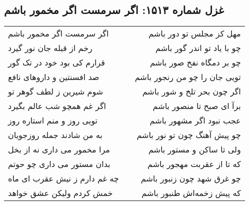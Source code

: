 \begin{center}
\section*{غزل شماره ۱۵۱۳: اگر سرمست اگر مخمور باشم}
\label{sec:1513}
\begin{longtable}{l p{0.5cm} r}
اگر سرمست اگر مخمور باشم
&&
مهل کز مجلس تو دور باشم
\\
رخم از قبله جان نور گیرد
&&
چو با یاد تو اندر گور باشم
\\
قرارم کی بود خود در تک گور
&&
چو بر دمگاه نفخ صور باشم
\\
صد افسنتین و داروهای نافع
&&
تویی جان را چو من رنجور باشم
\\
شوم شیرین ز لطف گوهر تو
&&
اگر چون بحر تلخ و شور باشم
\\
اگر غم همچو شب عالم بگیرد
&&
برآ ای صبح تا منصور باشم
\\
تویی روز و منم استاره روز
&&
عجب نبود اگر مشهور باشم
\\
به من شادند جمله روزجویان
&&
چو پیش آهنگ چون تو نور باشم
\\
مرا مخمور می داری نه از بخل
&&
ولی تا ساکن و مستور باشم
\\
بدان مستور می داری چو حوتم
&&
که تا از عقربت مهجور باشم
\\
چه غم دارم ز نیش عقرب ای ماه
&&
چو غرق شهد چون زنبور باشم
\\
خمش کردم ولیکن عشق خواهد
&&
که پیش زخمه‌اش طنبور باشم
\\
\end{longtable}
\end{center}
